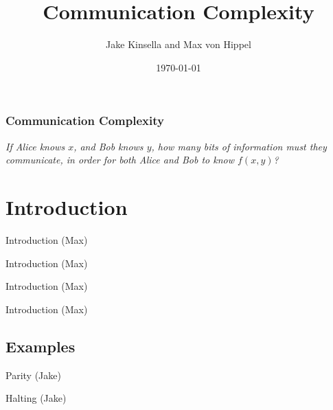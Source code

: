 \documentclass{beamer}
\title{Communication Complexity}
\author{Jake Kinsella and Max von Hippel}
\institute{Northeastern University}
\date{\today}
\begin{document}
\frame{\titlepage}

\begin{frame}
\frametitle{Communication Complexity}
\emph{If Alice knows $x$, and Bob knows $y$, how many bits of information must they communicate, in order for both Alice and Bob to know $f(x, y)$?}
\end{frame}

\begin{frame}
\tableofcontents
\end{frame}


\section{Introduction}

\begin{frame}{Introduction (Max)}

\end{frame}

\begin{frame}{Introduction (Max)}

\end{frame}

\begin{frame}{Introduction (Max)}

\end{frame}

\begin{frame}{Introduction (Max)}

\end{frame}

\subsection{Examples}

\begin{frame}{Parity (Jake)}

\end{frame}

\begin{frame}{Halting (Jake)}

\end{frame}
\end{document}
